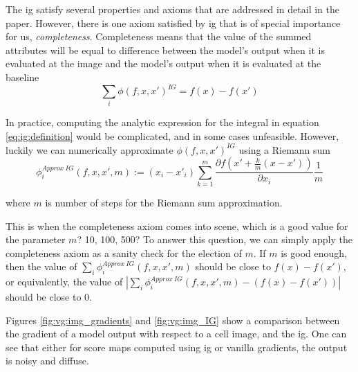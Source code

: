 The \gls{ig} satisfy several properties and axioms that are addressed in detail in the paper. However, there is one axiom satisfied by \gls{ig} that is of special importance for us, \textit{completeness}. Completeness means that the value of the summed attributes will be equal to difference between the model's output when it is evaluated at the image and the model's output when it is evaluated at the baseline
\begin{equation}
  \sum_i \phi(f, x, x')^{IG} = f(x) - f(x')
  \label{eq:ig_completeness}
\end{equation}

In practice, computing the analytic expression for the integral in equation \ref{eq:ig:definition} would be complicated, and in some cases unfeasible.
However, luckily we can numerically approximate $\phi(f, x, x')^{IG}$ using a Riemann sum
\begin{equation}
  \phi^{Approx\ IG}_i(f, x, x', m) := (x_{i} - x'_{i})\sum_{k=1}^m\frac{\partial f(x'+\frac{k}{m} (x - x'))}{\partial x_i} \frac{1}{m}
  \label{eq:ig:approx}
\end{equation}

\noindent where $m$ is number of steps for the Riemann sum approximation.

This is when the completeness axiom comes into scene, which is a good value for the parameter $m$? 10, 100, 500? To answer this question, we can simply apply the completeness axiom as a sanity check for the election of $m$. If $m$ is good enough, then the value of $\sum_i \phi^{Approx\ IG}_i(f, x, x', m)$ should be close to $f(x)-f(x')$, or equivalently, the value of $|\sum_i \phi^{Approx\ IG}_i(f, x, x', m) - (f(x)-f(x'))|$ should be close to 0.

Figures \ref{fig:vg:img_gradients} and \ref{fig:vg:img_IG} show a comparison between the gradient of a model output with respect to a cell image, and the \gls{ig}. One can see that either for score maps computed using \gls{ig} or vanilla gradients, the output is noisy and diffuse.
